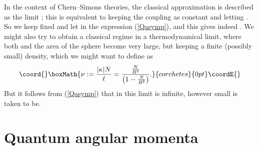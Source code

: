 \documentclass[a4paper,11pt]{article}
\begin{document}
In the context of Chern--Simons theories, the classical approximation
is described as the limit \myHighlight{$|\kappa|\rightarrow \infty$}\coordHE{}; this 
is equivalent to keeping the coupling \myHighlight{$\mu$}\coordHE{} as constant and letting
\coordHE{}. So we keep \coordHE{} fixed and let 
\myHighlight{$\ell \rightarrow \infty$}\coordHE{} in the expression
(\ref{Qasymp}), and this gives indeed \coordHE{}.
We might also try to obtain a classical regime in a thermodynamical
limit, where both \coordHE{} and the area of the sphere become very large,
but keeping a finite (possibly small) density, which we might want
to define as
\[\coord{}\boxMath{
\nu:=\frac{|\kappa| N}{\ell}=
\frac{\frac{N}{R^{2}}}{\left(1-\frac{N}{R^{2}} \right)}.
}{corchetes}{0pt}\coordE{}\]
But it follows from (\ref{Qasymp}) that in this limit \coordHE{} is infinite,
however small \myHighlight{$\nu$}\coordHE{} is taken to be.



\section{Quantum angular momenta}
\end{document}
